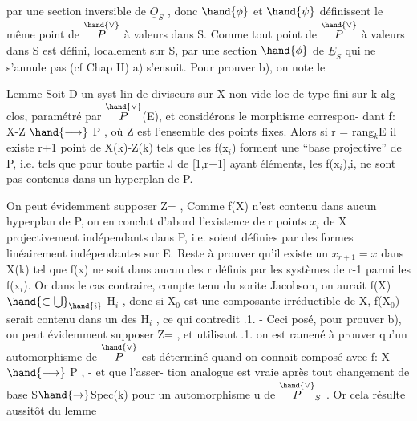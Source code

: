 
par une section inversible de $\underline{O}_S$ , donc $\hand{\phi}$ et $\hand{\psi}$ définissent le même point
de $\overset{\hand{\vee}}{P}$ à valeurs dans S. Comme tout point de $\overset{\hand{\vee}}{P}$ à valeurs dans S est défini,
localement sur S, par une section $\hand{\phi}$ de $\underline{E}_S$ qui ne s'annule pas (cf Chap II)
a) s'ensuit.   Pour prouver b), on note le

\uline{Lemme}   Soit D un syst lin de diviseurs sur X non vide loc de type fini
sur k alg clos, paramétré par $\overset{\hand{\vee}}{P}$(E), et considérons le morphisme correspon-%
dant  f: X-Z $\hand{\longrightarrow}$ P , où Z est l'ensemble des points fixes. Alors  si
r = rang$_k$E  il existe  r+1 point de  X(k)-Z(k)  tels que les
f(x$_i$) forment une  ``base projective'' de P, i.e. tels que  pour toute
partie J de [1,r+1] ayant   éléments,  les  f(x$_i$),i,  ne sont pas
contenus dans un hyperplan de P.

On peut évidemment supposer Z=\hand{$\emptyset$} ,   Comme  f(X) n'est contenu dans
aucun hyperplan de P, on en conclut d'abord l'existence de r points
$x_i$ de X  projectivement indépendants dans P, i.e. soient définies
par des formes linéairement indépendantes sur E.   Reste à prouver qu'il
existe un  $x_{r+1} = x$   dans X(k) tel que  f(x) ne soit dans aucun des r
  définis par les  systèmes de r-1 parmi les f(x$_i$). Or dans
le cas contraire, compte tenu du sorite Jacobson,  on aurait
f(X) $\hand{\subset\bigcup}_{\hand{i}}$ H$_i$ , donc  si X$_0$  est une composante
irréductible de X, f(X$_0$) serait contenu dans un des H$_i$ , ce qui contredit
.1. - Ceci posé,  pour prouver b), on peut  évidemment supposer Z=\hand{$\emptyset$} ,
et utilisant .1.  on est ramené à prouver qu'un automorphisme de $\overset{\hand{\vee}}{P}$ est
déterminé quand on connait  composé avec f: X$\hand{\longrightarrow}$ P , - et que l'asser-%
tion analogue est vraie après tout changement de base S$\hand{\rightarrow}$Spec(k)
pour un  automorphisme u de $\overset{\hand{\vee}}{P}_S$  .  Or cela résulte aussitôt  du lemme

